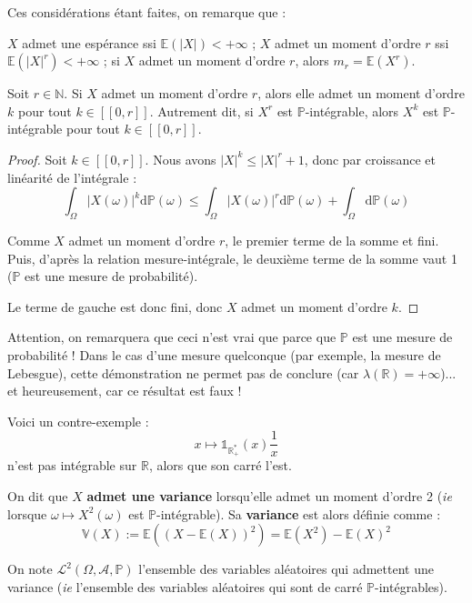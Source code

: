 \documentclass[../integ-proba.tex]{subfiles}
\begin{document}
\begin{rem}
    Ces considérations étant faites, on remarque que :
    \begin{itemize}
        \itemb $X$ admet une espérance ssi $\mathbb{E}(\left| X \right|) < +\infty$ ;
        \itemb $X$ admet un moment d'ordre $r$ ssi $\mathbb{E}(\left| X \right|^r) < +\infty$ ;
        \itemb si $X$ admet un moment d'ordre $r$, alors $m_r = \mathbb{E}(X^r)$.
    \end{itemize}
\end{rem}

\begin{prop}
    \label{prop:moments_cascade}
    Soit $r\in\mathbb{N}$. Si $X$ admet un moment d'ordre $r$, alors elle admet un moment d'ordre $k$ pour tout $k\in[\![0,r]\!]$.
    Autrement dit, si $X^r$ est $\mathbb{P}$-intégrable, alors $X^k$ est $\mathbb{P}$-intégrable pour tout $k\in[\![0,r]\!]$.
\end{prop}

\begin{proof}
    Soit $k\in[\![0,r]\!]$. Nous avons $\left|X\right|^k \leq \left|X\right|^r+1$, donc par croissance et linéarité de l'intégrale :
    $$
    \int_\Omega \left|X(\omega)\right|^k \text{d}\mathbb{P}(\omega) \leq \int_\Omega \left|X(\omega)\right|^r \text{d}\mathbb{P}(\omega) + \int_\Omega \text{d}\mathbb{P}(\omega)
    $$

    Comme $X$ admet un moment d'ordre $r$, le premier terme de la somme et fini.
    Puis, d'après la relation mesure-intégrale, le deuxième terme de la somme vaut 1 ($\mathbb{P}$ est une mesure de probabilité).
    
    Le terme de gauche est donc fini, donc $X$ admet un moment d'ordre $k$.
\end{proof}

\begin{rem}
    \label{rem:warning_moments}
    Attention, on remarquera que ceci n'est vrai que parce que $\mathbb{P}$ est une mesure de probabilité !
    Dans le cas d'une mesure quelconque (par exemple, la mesure de Lebesgue), cette démonstration ne permet pas de conclure (car $\lambda(\mathbb{R}) = +\infty$)... et heureusement, car ce résultat est faux !

    Voici un contre-exemple :
    $$x \mapsto \mathds{1}_{\mathbb{R}_+^*}(x)\frac{1}{x}$$
    n'est pas intégrable sur $\mathbb{R}$, alors que son carré l'est.
\end{rem}

\begin{defi}
    On dit que $X$ \textbf{admet une variance} lorsqu'elle admet un moment d'ordre 2 (\textit{ie} lorsque $\omega \mapsto X^2\left(\omega\right)$ est $\mathbb{P}$-intégrable).
    Sa \textbf{variance} est alors définie comme :
    $$
    \mathbb{V}(X):=\mathbb{E}\left(\left(X - \mathbb{E}\left(X\right)\right)^2\right)=\mathbb{E}\left(X^2\right) - \mathbb{E}\left(X\right)^2
    $$
    
    On note $\mathcal{L}^2\left(\Omega, \mathcal{A}, \mathbb{P}\right)$ l'ensemble des variables aléatoires qui admettent une variance (\textit{ie} l'ensemble des variables aléatoires qui sont de carré $\mathbb{P}$-intégrables).
\end{defi}
\end{document}
